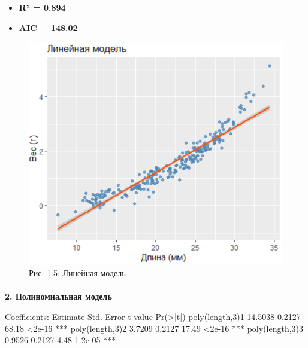 \documentclass[
  letterpaper,
  DIV=11,
  numbers=noendperiod]{scrreprt}
\makeatletter
\let\oldparagraph\paragraph
\renewcommand{\paragraph}{
    \@ifstar
      \xxxParagraphStar
      \xxxParagraphNoStar
  }
\newcommand{\xxxParagraphStar}[1]{\oldparagraph*{#1}\mbox{}}
\newcommand{\xxxParagraphNoStar}[1]{\oldparagraph{#1}\mbox{}}
\newenvironment{Shaded}{\begin{snugshade}}{\end{snugshade}}
\newcommand{\DecValTok}[1]{\textcolor[rgb]{0.68,0.00,0.00}{#1}}
\newcommand{\ErrorTok}[1]{\textcolor[rgb]{0.68,0.00,0.00}{#1}}
\newcommand{\FloatTok}[1]{\textcolor[rgb]{0.68,0.00,0.00}{#1}}
\newcommand{\FunctionTok}[1]{\textcolor[rgb]{0.28,0.35,0.67}{#1}}
\newcommand{\NormalTok}[1]{\textcolor[rgb]{0.00,0.23,0.31}{#1}}
\newcommand{\SpecialCharTok}[1]{\textcolor[rgb]{0.37,0.37,0.37}{#1}}
\makeatother
\begin{document}
\begin{itemize}
\item
  \textbf{R² = 0.894}
\item
  \textbf{AIC = 148.02}
\end{itemize}

\begin{figure}[H]

{\centering \includegraphics[width=0.6\linewidth,height=\textheight,keepaspectratio]{images/linear_shrimp.PNG}

}

\caption{Рис. 1.5: Линейная модель}

\end{figure}%

\paragraph{\texorpdfstring{\textbf{2. Полиномиальная
модель}}{2. Полиномиальная модель}}\label{ux43fux43eux43bux438ux43dux43eux43cux438ux430ux43bux44cux43dux430ux44f-ux43cux43eux434ux435ux43bux44c}

\begin{Shaded}
\begin{Highlighting}[]
\NormalTok{Coefficients}\SpecialCharTok{:}
\NormalTok{                 Estimate Std. Error t value }\FunctionTok{Pr}\NormalTok{(}\SpecialCharTok{\textgreater{}}\ErrorTok{|}\NormalTok{t}\SpecialCharTok{|}\NormalTok{)    }
\FunctionTok{poly}\NormalTok{(length,}\DecValTok{3}\NormalTok{)}\DecValTok{1}  \FloatTok{14.5038}    \FloatTok{0.2127}    \FloatTok{68.18}   \SpecialCharTok{\textless{}}\FloatTok{2e{-}16} \SpecialCharTok{**}\ErrorTok{*}
\FunctionTok{poly}\NormalTok{(length,}\DecValTok{3}\NormalTok{)}\DecValTok{2}   \FloatTok{3.7209}    \FloatTok{0.2127}    \FloatTok{17.49}   \SpecialCharTok{\textless{}}\FloatTok{2e{-}16} \SpecialCharTok{**}\ErrorTok{*}
\FunctionTok{poly}\NormalTok{(length,}\DecValTok{3}\NormalTok{)}\DecValTok{3}   \FloatTok{0.9526}    \FloatTok{0.2127}     \FloatTok{4.48}  \FloatTok{1.2e{-}05} \SpecialCharTok{**}\ErrorTok{*}
\end{Highlighting}
\end{Shaded}
\end{document}
